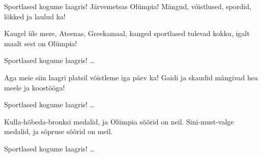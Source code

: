 
Sportlased kogume laagris!
J\"arvemetsas Ol\"umpia!
M\"angud, v\~oistlused, spordid,
l\~okked ja laulud ka!

Kaugel \"ule mere,
Ateenas, Greekamaal,
kanged sportlased tulevad kokku,
igalt maalt sest on Ol\"umpia!

Sportlased kogume laagris! \ldots

Aga meie siin laagri platsil
v\~oistleme iga p\"aev ka!
Gaidi ja skaudid m\"angivad
hea meele ja koost\"o\"oga!

Sportlased kogume laagris! \ldots

Kulla-h\~obeda-bronksi medalid,
ja Ol\"umpia s\~o\~orid on neil.
Sini-must-valge medalid,
ja s\~opruse s\~o\~orid on meil.

Sportlased kogume laagris! \ldots
